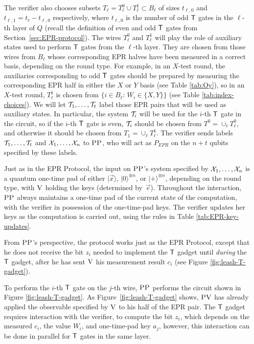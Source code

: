 \documentclass[11pt]{article}
\theoremstyle{remark}
\theoremstyle{definition}
\newcommand{\ket}[1]{|#1\rangle}
\newcommand{\ver}{\textsc{V}}
\newcommand{\pv}{\textsc{PV}}
\newcommand{\pp}{\textsc{PP}}
\begin{document}
The verifier also chooses subsets $T_\ell = T_\ell^0 \cup T_\ell^1 \subset B_\ell$ of sizes $t_{\ell,0}$ and $t_{\ell,1} = t_\ell-t_{\ell,0}$ respectively, where $t_{\ell,0}$ is the number of odd $\sf T$ gates in the $\ell$-th layer of $Q$ (recall the definition of even and odd $\sf T$ gates from Section~\ref{sec:EPR-protocol}). The wires $T^0_\ell$ and $T^1_\ell$ will play the role of auxiliary states used to perform $\sf T$ gates from the $\ell$-th layer. They are chosen from those wires from $B_\ell$ whose corresponding EPR halves have been measured in a correct basis, depending on the round type.  For example, in an $X$-test round, the auxiliaries corresponding to odd $\sf T$ gates should be prepared by measuring the corresponding EPR half in either the $X$ or $Y$ basis (see Table \ref{tab:Oy}), so in an $X$-test round, $T_\ell^1$ is chosen from $\{i\in B_\ell:\,W_i\in \{X,Y\}\}$ (see Table \ref{tab:index-choices}). We will let ${\cal T}_1,\dots,{\cal T}_t$ label those EPR pairs that will be used as auxiliary states. In particular, the system ${\cal T}_i$ will be used for the $i$-th $\sf T$ gate in the circuit, so if the $i$-th $\sf T$ gate is even, ${\cal T}_i$ should be chosen from $T^0=\cup_\ell T_\ell^0$, and otherwise it should be chosen from $T_1=\cup_\ell T_\ell^1$. The verifier sends labels ${\cal T}_1,\dots,{\cal T}_t$ and ${\cal X}_1,\dots,{\cal X}_n$ to $\pp$, who will act as $P_{EPR}$ on the $n+t$ qubits specified by these labels.


Just as in the EPR Protocol, the input on $\pp$'s system specified by ${\cal X}_1,\dots,{\cal X}_n$ is a quantum one-time pad of either $\ket{\vec{x}}$, $\ket{0}^{\otimes n}$, or $\ket{+}^{\otimes n}$, depending on the round type, with $\ver$ holding the keys (determined by~$\vec{e}$). Throughout the interaction, $\pp$ always maintains a one-time pad of the current state of the computation, with the verifier in possession of the one-time-pad keys. The verifier updates her keys as the computation is carried out, using the rules in Table \ref{tab:EPR-key-updates}. 




From $\pp$'s perspective, the protocol works just as the EPR Protocol, except that he does not receive the bit $z_i$ needed to implement the $\sf T$ gadget until \emph{during} the $\sf T$ gadget, after he has sent $\ver$ his measurement result $c_i$ (see Figure \ref{fig:leash-T-gadget}).


 
To perform the $i$-th $\sf T$ gate on the $j$-th wire, $\pp$ performs the circuit shown in Figure \ref{fig:leash-T-gadget}. As Figure~\ref{fig:leash-T-gadget} shows, $\pv$ has already applied the observable specified by $\ver$ to his half of the EPR pair. The $\sf T$ gadget requires interaction with the verifier, to compute the bit $z_i$, which depends on the measured $c_i$, the value $W_i$, and one-time-pad key $a_j$, however, this interaction can be done in parallel for $\sf T$ gates in the same layer. 
\end{document}
